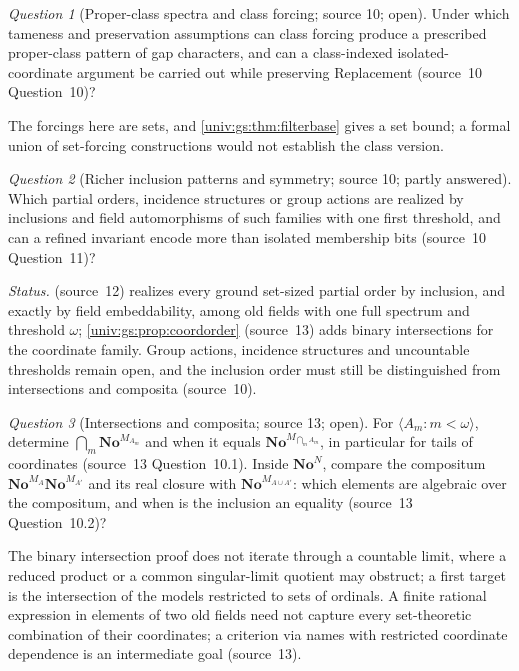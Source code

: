 \documentclass[11pt,letterpaper]{article}
\numberwithin{equation}{section}
\theoremstyle{definition}
\theoremstyle{remark}
\newtheorem{question}[question]{Question}
\newcommand{\No}{\mathbf{No}}
\newcommand{\NoN}{\No^{N}}
\newcommand{\seq}[1]{\langle#1\rangle}
\begin{document}
\begin{question}[Proper-class spectra and class forcing; source 10; open]\label{univ:gs:q:classforcing}
Under which tameness and preservation assumptions can class forcing produce a prescribed
proper-class pattern of gap characters, and can a class-indexed isolated-coordinate argument be
carried out while preserving Replacement (source~10 Question~10)?
\end{question}
The forcings here are sets, and \cref{univ:gs:thm:filterbase} gives a set bound; a formal union of
set-forcing constructions would not establish the class version.

\begin{question}[Richer inclusion patterns and symmetry; source 10; partly answered]\label{univ:gs:q:inclusion}
Which partial orders, incidence structures or group actions are realized by inclusions and field
automorphisms of such families with one first threshold, and can a refined invariant encode more
than isolated membership bits (source~10 Question~11)?
\end{question}
\emph{Status.}  (source~12) realizes every ground set-sized partial order by
inclusion, and exactly by field embeddability, among old fields with one full spectrum and
threshold $\omega$; \cref{univ:gs:prop:coordorder} (source~13) adds binary intersections for the
coordinate family. Group actions, incidence structures and uncountable thresholds remain open, and
the inclusion order must still be distinguished from intersections and composita (source~10).

\begin{question}[Intersections and composita; source 13; open]\label{univ:gs:q:intersections}
For $\seq{A_m:m<\omega}$, determine $\bigcap_m\No^{M_{A_m}}$ and when it equals
$\No^{M_{\bigcap_mA_m}}$, in particular for tails of coordinates (source~13 Question~10.1). Inside
$\NoN$, compare the compositum $\No^{M_A}\No^{M_{A'}}$ and its real closure with
$\No^{M_{A\cup A'}}$: which elements are algebraic over the compositum, and when is the inclusion
an equality (source~13 Question~10.2)?
\end{question}
The binary intersection proof does not iterate through a countable limit, where a reduced product
or a common singular-limit quotient may obstruct; a first target is the intersection of the models
restricted to sets of ordinals. A finite rational expression in elements of two old fields need not
capture every set-theoretic combination of their coordinates; a criterion via names with
restricted coordinate dependence is an intermediate goal (source~13).
\end{document}
